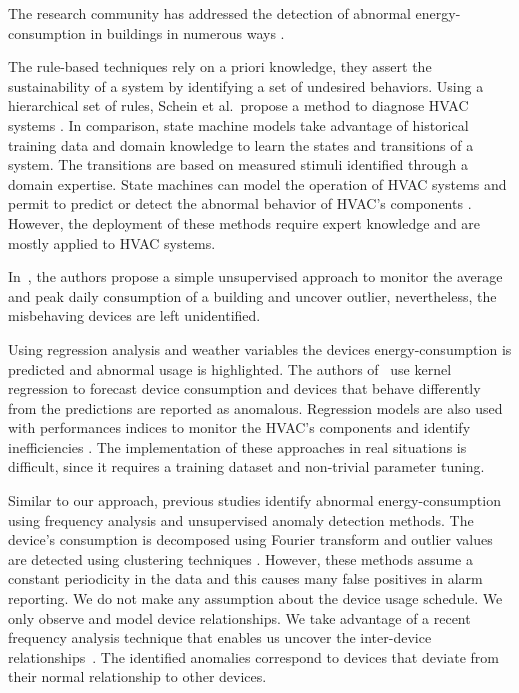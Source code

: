 The research community has addressed the detection of abnormal energy-consumption in buildings in numerous ways \cite{katipamula:1review2005,katipamula:2review2005}. 

The rule-based techniques rely on a priori knowledge, they assert the sustainability of a system by identifying a set of undesired behaviors.
Using a hierarchical set of rules, Schein et al.\ propose a method to diagnose HVAC systems \cite{schein:hvacr2006}.
In comparison, state machine models take advantage of historical training data and domain knowledge to learn the states and transitions of a system.
The transitions are based on measured stimuli identified through a domain expertise.
State machines can model the operation of HVAC systems \cite{patnaik:toist2011} and permit to predict or detect the abnormal behavior of HVAC's components \cite{bellala:buildsys2012}.
However, the deployment of these methods require expert knowledge and are mostly applied to HVAC systems.

In~\cite{seem:energybldg2007}, the authors propose a simple unsupervised approach to monitor the average and peak daily consumption of a building and uncover outlier, nevertheless, the misbehaving devices are left unidentified.

Using regression analysis and weather variables the devices energy-consumption is predicted and abnormal usage is highlighted.
The authors of~\cite{brown:buildperf2012} use kernel regression to forecast device consumption and devices that behave differently from the predictions are reported as anomalous.
Regression models are also used with performances indices to monitor the HVAC's components and identify inefficiencies \cite{zhou:wiley2009}.
The implementation of these approaches in real situations is difficult, since it requires a training dataset and non-trivial 
parameter tuning.

Similar to our approach, previous studies identify abnormal energy-consumption using frequency analysis and unsupervised anomaly detection methods.
The device's consumption is decomposed using Fourier transform and outlier values are detected using clustering 
techniques \cite{Bellala_buildsys11,wrinch:pes2012,chen:aaaiw2011}. %
However, these methods assume a constant periodicity in the data and this causes many false positives in alarm reporting.  %
We do not make any assumption about the device usage schedule.  We only observe and model device relationships.
We take advantage of a recent frequency analysis technique that enables us uncover the inter-device relationships~\cite{romain:iotapp12}.
The identified anomalies correspond to devices that deviate from their normal relationship to other devices.

